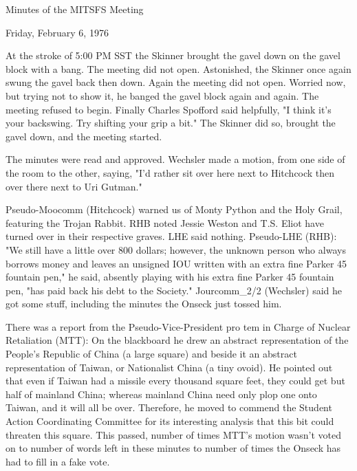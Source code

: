 \documentclass[12pt]{article}
\begin{document}
\begin{center}

Minutes of the MITSFS Meeting

Friday, February 6, 1976

\end{center}
 
\vspace{12pt}

\setlength{\parskip}{6pt}

\noindent
At the stroke of 5:00 PM SST the Skinner brought the gavel down on the gavel block with a bang. The meeting did not open. Astonished, the Skinner once again swung the gavel back then down. Again the meeting did not open. Worried now, but trying not to show it, he banged the gavel block again and again. The meeting refused to begin. Finally Charles Spofford said helpfully, "I think it's your backswing. Try shifting your grip a bit." The Skinner did so, brought the gavel down, and the meeting started.

The minutes were read and approved. Wechsler made a motion, from one side of the room to the other, saying, "I'd rather sit over here next to Hitchcock then over there next to Uri Gutman."

Pseudo-Moocomm (Hitchcock) warned us of Monty Python and the
Holy Grail, featuring the Trojan Rabbit. RHB noted Jessie Weston and T.S. Eliot have turned over in their respective graves. LHE said nothing. Pseudo-LHE (RHB): "We still have a little over 800 dollars; however, the unknown person who always borrows money and leaves an unsigned IOU written with an extra fine Parker 45 fountain pen," he said, absently playing with his extra fine Parker 45 fountain pen, "has paid back his debt to the Society." Jourcomm_2/2 (Wechsler) said he got some stuff, including the minutes the Onseck just tossed him.

There was a report from the Pseudo-Vice-President pro tem in Charge of Nuclear Retaliation (MTT): On the blackboard he drew an abstract representation of the People's Republic of China (a large square) and beside it an abstract representation of Taiwan, or Nationalist China (a tiny ovoid). He pointed out that even if Taiwan had a missile every thousand square feet, they could get but half of mainland China; whereas mainland China need only plop one onto Taiwan, and it will all be over. Therefore, he moved to commend the Student Action Coordinating Committee for its interesting analysis that this bit could threaten this square. This passed, number of times MTT's motion wasn't voted on to number of words left in these minutes to number of times the Onseck has had to fill in a fake vote.
\end{document}
